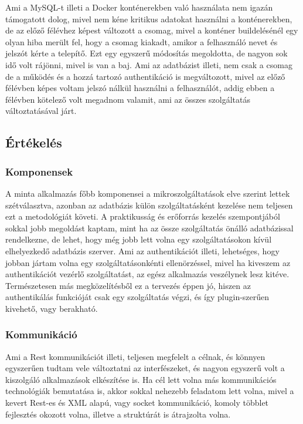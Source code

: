 \documentclass[11pt,magyar,a4paper,twoside,]{report}
\begin{document}
Ami a MySQL-t illeti a Docker konténerekben való használata nem igazán
támogatott dolog, mivel nem kéne kritikus adatokat használni a
konténerekben, de az előző félévhez képest változott a csomag, mivel a
konténer buildelésénél egy olyan hiba merült fel, hogy a csomag kiakadt,
amikor a felhasználó nevet és jelszót kérte a telepítő. Ezt egy egyszerű
módosítás megoldotta, de nagyon sok idő volt rájönni, mivel is van a
baj. Ami az adatbázist illeti, nem csak a csomag de a működés és a hozzá
tartozó authentikáció is megváltozott, mivel az előző félévben képes
voltam jelszó nálkül használni a felhasználót, addig ebben a félévben
kötelező volt megadnom valamit, ami az összes szolgáltatás
változtatásával járt.

\subsection{Értékelés}\label{uxe9rtuxe9keluxe9s-1}

\subsubsection{Komponensek}\label{komponensek}

A minta alkalmazás főbb komponensei a mikroszolgáltatások elve szerint
lettek szétválasztva, azonban az adatbázis külön szolgáltatásként
kezelése nem teljesen ezt a metodológiát követi. A praktikusság és
erőforrás kezelés szempontjából sokkal jobb megoldást kaptam, mint ha az
össze szolgáltatás önálló adatbázissal rendelkezne, de lehet, hogy még
jobb lett volna egy szolgáltatásokon kívül elhelyezkedő adatbázis
szerver. Ami az authentikációt illeti, lehetséges, hogy jobban jártam
volna egy szolgáltatásonkénti ellenörzéssel, mivel ha kiveszem az
authentikációt vezérlő szolgáltatást, az egész alkalmazás veszélynek
lesz kitéve. Természetesen más megközelítésből ez a tervezés éppen jó,
hiszen az authentikálás funkcióját csak egy szolgáltatás végzi, és így
plugin-szerűen kivehető, vagy berakható.

\subsubsection{Kommunikáció}\label{kommunikuxe1ciuxf3}

Ami a Rest kommunikációt illeti, teljesen megfelelt a célnak, és könnyen
egyszerűen tudtam vele változtatni az interfészeket, és nagyon egyszerű
volt a kiszolgáló alkalmazások elkészítése is. Ha cél lett volna más
kommunikációs technológiák bemutatása is, akkor sokkal nehezebb
feladatom lett volna, mivel a kevert Rest-es és XML alapú, vagy socket
kommunikáció, komoly többlet fejlesztés okozott volna, illetve a
struktúrát is átrajzolta volna.
\end{document}
